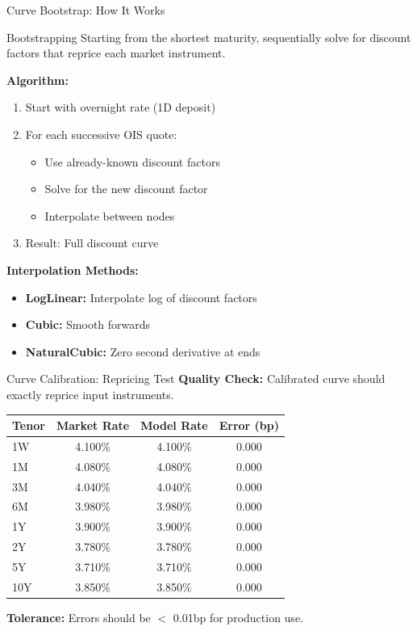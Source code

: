 \documentclass[aspectratio=169,11pt]{beamer}
\begin{document}
\begin{frame}{Curve Bootstrap: How It Works}
\begin{block}{Bootstrapping}
Starting from the shortest maturity, sequentially solve for discount factors that reprice each market instrument.
\end{block}

\textbf{Algorithm:}
\begin{enumerate}
    \item Start with overnight rate (1D deposit)
    \item For each successive OIS quote:
    \begin{itemize}
        \item Use already-known discount factors
        \item Solve for the new discount factor
        \item Interpolate between nodes
    \end{itemize}
    \item Result: Full discount curve
\end{enumerate}

\textbf{Interpolation Methods:}
\begin{itemize}
    \item \textbf{LogLinear:} Interpolate log of discount factors
    \item \textbf{Cubic:} Smooth forwards
    \item \textbf{NaturalCubic:} Zero second derivative at ends
\end{itemize}
\end{frame}

\begin{frame}{Curve Calibration: Repricing Test}
\textbf{Quality Check:} Calibrated curve should exactly reprice input instruments.

\begin{center}
\begin{tabular}{lccc}
\toprule
Tenor & Market Rate & Model Rate & Error (bp) \\
\midrule
1W & 4.100\% & 4.100\% & 0.000 \\
1M & 4.080\% & 4.080\% & 0.000 \\
3M & 4.040\% & 4.040\% & 0.000 \\
6M & 3.980\% & 3.980\% & 0.000 \\
1Y & 3.900\% & 3.900\% & 0.000 \\
2Y & 3.780\% & 3.780\% & 0.000 \\
5Y & 3.710\% & 3.710\% & 0.000 \\
10Y & 3.850\% & 3.850\% & 0.000 \\
\bottomrule
\end{tabular}
\end{center}

\textbf{Tolerance:} Errors should be $<$ 0.01bp for production use.
\end{frame}
\end{document}
